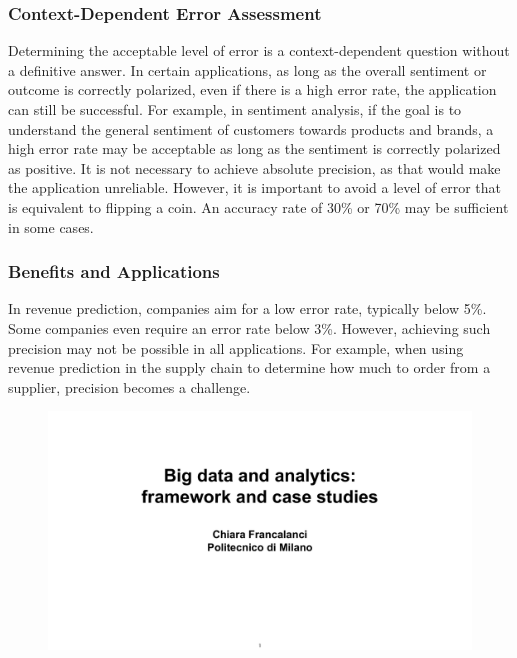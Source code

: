 \subsubsection{Context-Dependent Error Assessment}

Determining the acceptable level of error is a context-dependent
question without a definitive answer. In certain applications, as long
as the overall sentiment or outcome is correctly polarized, even if
there is a high error rate, the application can still be successful. For
example, in sentiment analysis, if the goal is to understand the general
sentiment of customers towards products and brands, a high error rate
may be acceptable as long as the sentiment is correctly polarized as
positive. It is not necessary to achieve absolute precision, as that
would make the application unreliable. However, it is important to avoid
a level of error that is equivalent to flipping a coin. An accuracy rate
of 30\% or 70\% may be sufficient in some cases.

\subsubsection{Benefits and Applications}

In revenue prediction, companies aim for a low error rate, typically
below 5\%. Some companies even require an error rate below 3\%. However,
achieving such precision may not be possible in all applications. For
example, when using revenue prediction in the supply chain to determine
how much to order from a supplier, precision becomes a challenge.

\begin{figure}[!h]
    \centering
    \includegraphics[page=24, trim = 0cm 2cm 1.5cm 3.5cm, clip, width=\textwidth]{images/06 - BIG_DATA.pdf}
\end{figure}



